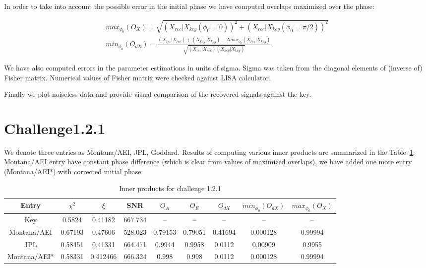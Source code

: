 \documentclass[prd,aps,amsfonts,amsmath, nofootinbib]{revtex4}
\def\bea{\begin{eqnarray}}
\def\ena{\end{eqnarray}}
\begin{document}
In order to take into account the possible error in the initial 
phase we have computed overlaps maximized over the phase:

\bea
max_{\phi_0}(O_X) = \sqrt{(X_{rec}|X_{key}(\phi_0 = 0))^2 +
(X_{rec}|X_{key}(\phi_0 = \pi/2))^2}\\
min_{\phi_0}(O_{dX}) = \frac{ (X_{rec}|X_{rec}) + (X_{key}|X_{key}) -
2 max_{\phi_0}(X_{rec}|X_{key})}{\sqrt{(X_{rec}|X_{rec})(X_{key}|X_{key})}}
\ena

We have also computed errors in the parameter estimations in units 
of sigma. Sigma was taken from the diagonal elements of (inverse of) Fisher matrix. Numerical values of Fisher matrix were checked against
LISA calculator.

Finally we plot noiseless data and provide visual comparison of the 
recovered signals against the key.

\section{Challenge1.2.1}

We denote three entries as Montana/AEI, JPL, Goddard.
Results of computing various inner products are summarized in the 
Table~\ref{OlapsTable1.2.1}. Montana/AEI entry have constant phase difference (which is clear from values of
maximized overlaps), we have added one more entry (Montana/AEI*) with corrected initial phase.

\begin{table}
\caption{\label{OlapsTable1.2.1} Inner products for challenge 1.2.1}
\begin{ruledtabular}
\begin{tabular}{|c|c|c|c|c|c|c|c|c|}
Entry & $\chi^2$ & $\xi$ & SNR & $O_A$ & $O_E$ & $O_{dX}$ & $min_{\phi_0}(O_{dX})$ & $max_{\phi_0}(O_X)$\\
\hline
Key & 0.5824 & 0.41182 & 667.734 &  -- & -- & -- & -- & -- \\
Montana/AEI & 0.67193 & 0.47606 & 528.023 & 0.79153 & 0.79051 &
0.41694 & 0.000128 & 0.99994\\
JPL & 0.58451 & 0.41331 & 664.471 & 0.9944 & 0.9958 & 0.0112 &  0.00909 & 0.9955\\
Montana/AEI* & 0.58331 & 0.412466 & 666.324 & 0.998 & 0.998 & 0.0112 & 0.000128 & 0.99994 \\
\hline
\end{tabular}
\end{ruledtabular}
\end{table}
\end{document}
